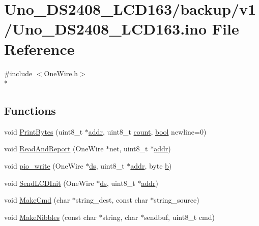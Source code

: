 \hypertarget{backup_2v1_2Uno__DS2408__LCD163_8ino}{\section{Uno\-\_\-\-D\-S2408\-\_\-\-L\-C\-D163/backup/v1/\-Uno\-\_\-\-D\-S2408\-\_\-\-L\-C\-D163.ino File Reference}
\label{backup_2v1_2Uno__DS2408__LCD163_8ino}
}
{\ttfamily \#include $<$One\-Wire.\-h$>$}\\*
\subsection*{Functions}
\begin{DoxyCompactItemize}
\item 
void \hyperlink{backup_2v1_2Uno__DS2408__LCD163_8ino_a7129fd7e5da9d889e1b404ead2db2fc5}{Print\-Bytes} (uint8\-\_\-t $\ast$\hyperlink{OWP__DG__1w-adaptor_8ino_a0fc5da2e63a94559429ec9aec32f1831}{addr}, uint8\-\_\-t \hyperlink{Uno__Dragino__LoRa__GPS__Shield__TTN_8ino_a16ff2d8e15ade4948398b0aeb80124a8}{count}, \hyperlink{stdbool_8h_abb452686968e48b67397da5f97445f5b}{bool} newline=0)
\item 
void \hyperlink{backup_2v1_2Uno__DS2408__LCD163_8ino_adce6de6b0be4134eefba3efa4ca8e7cc}{Read\-And\-Report} (One\-Wire $\ast$net, uint8\-\_\-t $\ast$\hyperlink{OWP__DG__1w-adaptor_8ino_a0fc5da2e63a94559429ec9aec32f1831}{addr})
\item 
void \hyperlink{backup_2v1_2Uno__DS2408__LCD163_8ino_a1e26c3a08c3767822ad391876a888fcf}{pio\-\_\-write} (One\-Wire $\ast$\hyperlink{OWRain1_8ino_af75456870b9486275b406e13b003fb11}{ds}, uint8\-\_\-t $\ast$\hyperlink{OWP__DG__1w-adaptor_8ino_a0fc5da2e63a94559429ec9aec32f1831}{addr}, byte \hyperlink{IMU_8cpp_a20f3a6e8a2ba2537edf801801628417b}{b})
\item 
void \hyperlink{backup_2v1_2Uno__DS2408__LCD163_8ino_a0346e7b740407034d2bd4974762115d5}{Send\-L\-C\-D\-Init} (One\-Wire $\ast$\hyperlink{OWRain1_8ino_af75456870b9486275b406e13b003fb11}{ds}, uint8\-\_\-t $\ast$\hyperlink{OWP__DG__1w-adaptor_8ino_a0fc5da2e63a94559429ec9aec32f1831}{addr})
\item 
void \hyperlink{backup_2v1_2Uno__DS2408__LCD163_8ino_ab8330ae5933821840970969e68e3a258}{Make\-Cmd} (char $\ast$string\-\_\-dest, const char $\ast$string\-\_\-source)
\item 
void \hyperlink{backup_2v1_2Uno__DS2408__LCD163_8ino_af4bb4cb579e98255856126016440b6d7}{Make\-Nibbles} (const char $\ast$string, char $\ast$sendbuf, uint8\-\_\-t cmd)

\end{DoxyCompactItemize}
